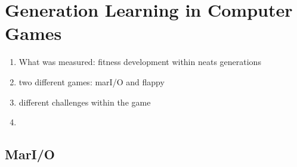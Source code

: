 %
\chapter{Generation Learning in Computer Games}
\label{sec:analysis}

\begin{enumerate}
	\item What was measured: fitness development within neats generations 
	\item two different games: marI/O and flappy
	\item different challenges within the game
	\item 
\end{enumerate}

	\section{MarI/O}
		\label{sec:analysis:mario}
		
